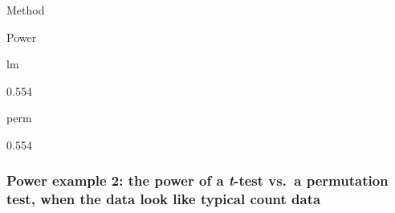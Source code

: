 \documentclass[]{book}
\begin{document}
Method

Power

lm

0.554

perm

0.554

\hypertarget{power-example-2-the-power-of-a-t-test-vs.-a-permutation-test-when-the-data-look-like-typical-count-data}{%
\subsubsection{\texorpdfstring{Power example 2: the power of a \emph{t}-test vs.~a permutation test, when the data look like typical count data}{Power example 2: the power of a t-test vs.~a permutation test, when the data look like typical count data}}\label{power-example-2-the-power-of-a-t-test-vs.-a-permutation-test-when-the-data-look-like-typical-count-data}}
\end{document}
